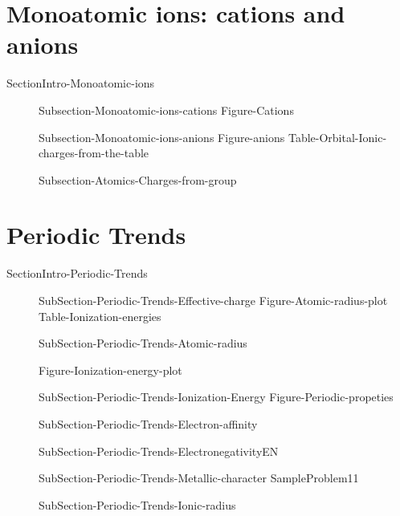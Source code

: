 \documentclass[main.tex]{subfiles}
\begin{document}
\section{Monoatomic ions: cations and anions}{SectionIntro-Monoatomic-ions}
\sloppy\begin{description}
\item[]{Subsection-Monoatomic-ions-cations}
{Figure-Cations}
\item[]{Subsection-Monoatomic-ions-anions}
{Figure-anions}
{Table-Orbital-Ionic-charges-from-the-table}

\item[]{Subsection-Atomics-Charges-from-group}


\end{description}
\newpage



\section{Periodic Trends}{SectionIntro-Periodic-Trends}
\vspace{0cm}{Figure-Atomic-radius}

\sloppy\begin{description}
\item[] {SubSection-Periodic-Trends-Effective-charge}
{Figure-Atomic-radius-plot}
{Table-Ionization-energies}

\item[] {SubSection-Periodic-Trends-Atomic-radius}

{Figure-Ionization-energy-plot}
\item[] {SubSection-Periodic-Trends-Ionization-Energy}
{Figure-Periodic-propeties}
\item[] {SubSection-Periodic-Trends-Electron-affinity}
\item[] {SubSection-Periodic-Trends-ElectronegativityEN}
\item[]{SubSection-Periodic-Trends-Metallic-character}
{SampleProblem11}
\item[]  {SubSection-Periodic-Trends-Ionic-radius}
\end{description}
\end{document}
